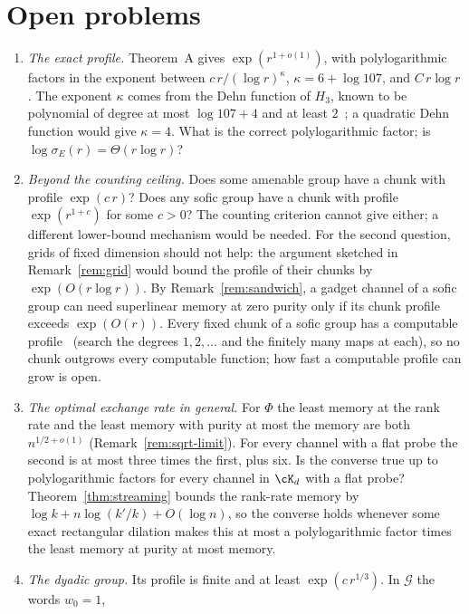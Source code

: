 \section{Open problems}\label{sec:open}

\begin{enumerate}[label=(\arabic*)]
\item \emph{The exact profile.} Theorem~A gives $\exp(r^{1+o(1)})$, with polylogarithmic factors in the exponent between
$c\,r/(\log r)^{\kappa}$, $\kappa=6+\log107$, and $C\,r\log r$. The exponent $\kappa$ comes from the Dehn function of $H_3$, known to be polynomial of
degree at most $\log107+4$ and at least $2$~\cite{DouglasMghirbiA}; a quadratic Dehn function would give $\kappa=4$. What is the correct
polylogarithmic factor; is $\log\sigma_E(r)=\Theta(r\log r)$?
\item \emph{Beyond the counting ceiling.} Does some amenable group have a chunk with profile $\exp(c\,r)$? Does any sofic group have a chunk with
profile $\exp(r^{1+c})$ for some $c>0$? The counting criterion cannot give either; a different lower-bound mechanism would be needed. For the
second question, grids of fixed dimension should not help: the argument sketched in Remark~\ref{rem:grid} would bound the profile of their
chunks by $\exp(O(r\log r))$. By
Remark~\ref{rem:sandwich}, a gadget channel of a sofic group can need superlinear memory at zero purity only if its chunk profile exceeds
$\exp(O(r))$. Every fixed chunk of a sofic group has a computable profile~\cite[Lemma~1]{Ivanov2021} (search the degrees $1,2,\dots$ and the finitely
many maps at each), so no chunk outgrows every computable function; how fast a computable profile can grow is open.
\item \emph{The optimal exchange rate in general.} For $\Phi$ the least memory at the rank rate and the least memory with purity at most the
memory are both $n^{1/2+o(1)}$ (Remark~\ref{rem:sqrt-limit}). For every channel with a flat probe the second is at most three times the first, plus
six. Is the converse true up to polylogarithmic factors for every channel in $\cK_d$ with a flat probe? Theorem~\ref{thm:streaming} bounds the
rank-rate memory by $\log k+n\log(k'/k)+O(\log n)$, so the converse holds whenever some exact rectangular dilation makes this at most a
polylogarithmic factor times the least memory at purity at most memory.
\item \emph{The dyadic group.} Its profile is finite and at least $\exp(c\,r^{1/3})$. In $\mathcal G$ the words $w_0=1$,

\end{enumerate}
